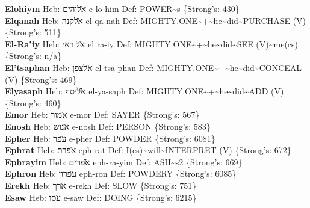 {\textbf{Elohiym} Heb: {\large\H אלוהים} e-lo-him Def: POWER\textasciitilde{}s \{Strong's: 430\}\hfill{}\\

\textbf{Elqanah} Heb: {\large\H אלקנה} el-qa-nah Def: MIGHTY.ONE\textasciitilde{}+\textasciitilde{}he\textasciitilde{}did\textasciitilde{}PURCHASE (V) \{Strong's: 511\}\hfill{}\\

\textbf{El-Ra'iy} Heb: {\large\H אל.ראי} el ra-iy Def: MIGHTY.ONE\textasciitilde{}+\textasciitilde{}he\textasciitilde{}did\textasciitilde{}SEE (V)\textasciitilde{}me(cs) \{Strong's: n/a\}\hfill{}\\

\textbf{El'tsaphan} Heb: {\large\H אלצפן} el-tsa-phan Def: MIGHTY.ONE\textasciitilde{}+\textasciitilde{}he\textasciitilde{}did\textasciitilde{}CONCEAL (V) \{Strong's: 469\}\hfill{}\\

\textbf{Elyasaph} Heb: {\large\H אליסף} el-ya-saph Def: MIGHTY.ONE\textasciitilde{}+\textasciitilde{}he\textasciitilde{}did\textasciitilde{}ADD (V) \{Strong's: 460\}\hfill{}\\

\textbf{Emor} Heb: {\large\H אמור} e-mor Def: SAYER \{Strong's: 567\}\hfill{}\\

\textbf{Enosh} Heb: {\large\H אנוש} e-nosh Def: PERSON \{Strong's: 583\}\hfill{}\\

\textbf{Epher} Heb: {\large\H עפר} e-pher Def: POWDER \{Strong's: 6081\}\hfill{}\\

\textbf{Ephrat} Heb: {\large\H אפרת} eph-rat Def: I(cs)\textasciitilde{}will\textasciitilde{}INTERPRET (V) \{Strong's: 672\}\hfill{}\\

\textbf{Ephrayim} Heb: {\large\H אפרים} eph-ra-yim Def: ASH\textasciitilde{}s2 \{Strong's: 669\}\hfill{}\\

\textbf{Ephron} Heb: {\large\H עפרון} eph-ron Def: POWDERY \{Strong's: 6085\}\hfill{}\\

\textbf{Erekh} Heb: {\large\H ארך} e-rekh Def: SLOW \{Strong's: 751\}\hfill{}\\

\textbf{Esaw} Heb: {\large\H עסו} e-saw Def: DOING \{Strong's: 6215\}\hfill{}\\

}
